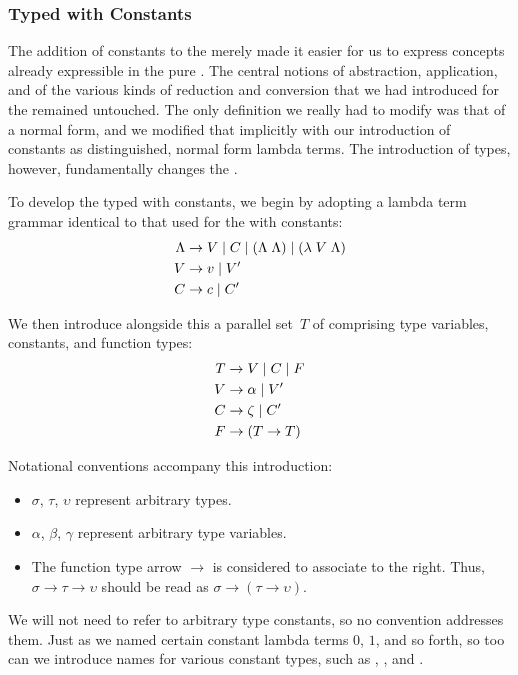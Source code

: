 \subsubsection[Typed with Constants]{Typed \LambdaCalc with Constants}
The addition of constants to the \lambdacalc merely made it easier for us to express concepts already expressible in the pure \lambdacalc{}. The central notions of abstraction, application, and of the various kinds of reduction and con\-ver\-sion that we had introduced for the \lambdacalc remained untouched. The only definition we really had to modify was that of a normal form, and we modified that implicitly with our introduction of constants as distinguished, normal form lambda terms. The introduction of types, however, fundamentally changes the \lambdacalc{}.

To develop the typed \lambdacalc with constants, we begin by adopting a lambda term grammar identical to that used for the \lambdacalc with constants:
\begin{align*}
\Lambda &\produces V \alt C \alt (\Lambda\; \Lambda) \alt (\lambda\; V\; \Lambda)\\
V &\produces v \alt V\prime\\
C &\produces c \alt C\prime
\end{align*}

We then introduce alongside this a parallel set~$T$ of  comprising type variables, constants, and function types:
\begin{align*}
T &\produces V \alt C \alt F\\
V &\produces \alpha \alt V\prime\\
C &\produces \zeta \alt C\prime\\
F &\produces (T \to T)
\end{align*}

Notational conventions accompany this introduction:
\begin{itemize}
\item $\sigma$, $\tau$, $\upsilon$ represent arbitrary types.
\item $\alpha$, $\beta$, $\gamma$ represent arbitrary type variables.
\item The function type arrow $\to$ is considered to associate to the right. Thus, $\sigma \to \tau \to \upsilon$ should be read as $\sigma \to (\tau \to \upsilon)$.
\end{itemize}
We will not need to refer to arbitrary type constants, so no convention addresses them. Just as we named certain constant lambda terms $0$, $1$, and so forth, so too can we introduce names for various constant types, such as , , and .

